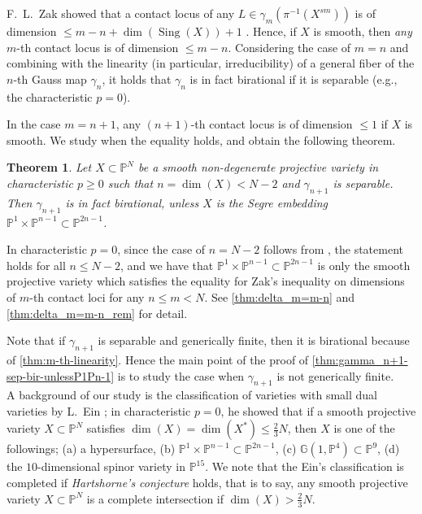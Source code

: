 \documentclass[a4paper,12pt]{amsart}
\theoremstyle{plain}
\newtheorem{thm}{Theorem}[section]
\theoremstyle{definition}
\begin{document}
F.~L.~Zak showed that
a contact locus of any $L \in \gamma_m(\pi^{-1}(X^{sm}))$ is of dimension
${\leqslant} m-n+\dim(\operatorname{Sing}(X))+1$
\cite[I. \textsection{}2, Theorem 2.3(a)]{Zak}.
Hence, if $X$ is smooth, then
\emph{any} $m$-th contact locus is of dimension ${\leqslant} m-n$.
Considering the case of $m = n$
and combining with the linearity (in particular, irreducibility)
of a general fiber of the $n$-th Gauss map $\gamma_n$,
it holds that $\gamma_n$ is in fact birational if it is separable
(e.g., the characteristic $p = 0$).

In the case $m=n+1$,
any $(n+1)$-th contact locus is of dimension ${\leqslant} 1$
if $X$ is smooth.
We study when the equality holds,
and obtain the following theorem.

\begin{thm} \label{thm:gamma_n+1-sep-bir-unlessP1Pn-1}
  Let $X \subset {{\mathbb{P}}^N}$ be a smooth non-degenerate projective variety in characteristic $p {\geqslant} 0$
  such that $n = \dim(X) < N-2$ and $\gamma_{n+1}$ is separable.
  Then $\gamma_{n+1}$ is in fact birational, unless
  $X$ is the Segre embedding ${\mathbb{P}}^1 \times {\mathbb{P}}^{n-1} \subset {\mathbb{P}}^{2n-1}$.
\end{thm}

In characteristic $p = 0$,
since the case of $n = N-2$ follows from \cite[Theorem~3.4]{Ein},
the statement holds for all $n {\leqslant} N-2$,
and we have that ${\mathbb{P}}^1 \times {\mathbb{P}}^{n-1} \subset {\mathbb{P}}^{2n-1}$
is only the smooth projective variety which satisfies
the equality for Zak's inequality on dimensions of $m$-th contact loci
for any $n {\leqslant} m < N$.
See \autoref{thm:delta_m=m-n} and \autoref{thm:delta_m=m-n_rem} for detail.

Note that if $\gamma_{n+1}$ is separable and generically finite,
then it is birational
because of
\autoref{thm:m-th-linearity}.
Hence the main point of the proof of \autoref{thm:gamma_n+1-sep-bir-unlessP1Pn-1}
is to study the case when $\gamma_{n+1}$ is not generically finite.
\\

A background of our study is the classification of varieties with small dual varieties by L.~Ein \cite{Ein};
in characteristic $p=0$, he showed that if a smooth projective variety $X \subset {{\mathbb{P}}^N}$ satisfies
$\dim (X) = \dim(X^*) {\leqslant} \frac{2}{3}N$,
then $X$ is one of the followings;
(a) a hypersurface, (b) ${\mathbb{P}}^1 \times {\mathbb{P}}^{n-1} \subset {\mathbb{P}}^{2n-1}$,
(c) ${\mathbb{G}}(1, {\mathbb{P}}^4) \subset {\mathbb{P}}^{9}$, (d) the $10$-dimensional spinor variety in ${\mathbb{P}}^{15}$.
We note that the Ein's classification is completed
if \emph{Hartshorne's conjecture} holds,
that is to say, any smooth projective variety $X \subset {{\mathbb{P}}^N}$ is a complete intersection if $\dim (X) > \frac{2}{3}N$.
\end{document}
